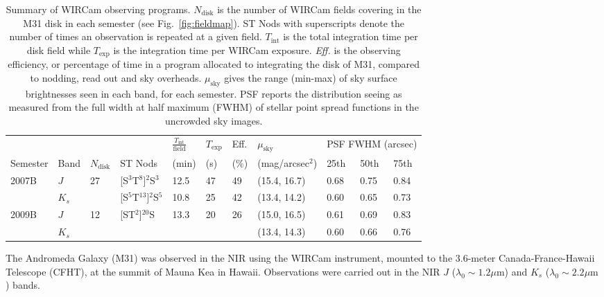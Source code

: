 \documentclass[iop]{emulateapj}
\newcommand{\Fig}[1]{Fig.~\ref{fig:#1}}  %
\begin{document}
\begin{table}[t]
\caption[Summary of WIRCam observing programs]{Summary of WIRCam observing programs.
$N_\mathrm{disk}$ is the number of WIRCam fields covering in the M31 disk in each semester (see \Fig{fieldmap}).
ST Nods with superscripts denote the number of times an observation is repeated at a given field.
$T_\mathrm{int}$ is the total integration time per disk field while $T_\mathrm{exp}$ is the integration time per WIRCam exposure.
\emph{Eff.} is the observing efficiency, or percentage of time in a program allocated to integrating the disk of M31, compared to nodding, read out and sky overheads.
$\mu_\mathrm{sky}$ gives the range (min-max) of sky surface brightnesses seen in each band, for each semester.
PSF reports the distribution seeing as measured from the full width at half maximum (FWHM) of stellar point spread functions in the uncrowded sky images.}
\label{tab:obssummary}
    
    \centering
    \begin{tabular}{lllllllllll}
        & & & & $\frac{T_\mathrm{int}}{\mathrm{field}}$ & $T_\mathrm{exp}$ & Eff. & $\mu_\mathrm{sky}$ & \multicolumn{3}{c}{PSF FWHM (arcsec)} \\ \cline{9-11}
    Semester & Band & $N_\mathrm{disk}$ & ST Nods & (min) &  (s) &  (\%) & (mag/arcsec$^2$) & 25th  & 50th & 75th \\
    \hline
    \multirow{2}{*}{2007B} & $J$ & \multirow{2}{*}{27} & [S$^3$T$^8$]$^{2}$S$^3$ & 12.5 & 47 & 49 & (15.4, 16.7) & 0.68 & 0.75 & 0.84 \\
     & $K_s$ &  & [S$^5$T$^{13}$]${^2}$S$^5$ & 10.8 & 25 & 42 & (13.4, 14.2) & 0.60 &  0.65 & 0.73 \\
     \hline
     \multirow{2}{*}{2009B} & $J$ & \multirow{2}{*}{12} & \multirow{2}{*}{[ST$^2$]$^{20}$S} & \multirow{2}{*}{13.3} & \multirow{2}{*}{20} & \multirow{2}{*}{26} & (15.0, 16.5) & 0.61 & 0.69 & 0.83 \\
                            & $K_s$ & & & & & & (13.4, 14.3) & 0.60 & 0.66 & 0.76 \\
    \end{tabular}
\end{table}

The Andromeda Galaxy (M31) was observed in the NIR using the WIRCam instrument, mounted to the 3.6-meter Canada-France-Hawaii Telescope (CFHT), at the summit of Mauna Kea in Hawaii.
Observations were carried out in the NIR $J$ ($\lambda_0 \sim 1.2 \mu\mathrm{m}$) and $K_s$ ($\lambda_0 \sim 2.2 \mu\mathrm{m}$) bands.
\end{document}
